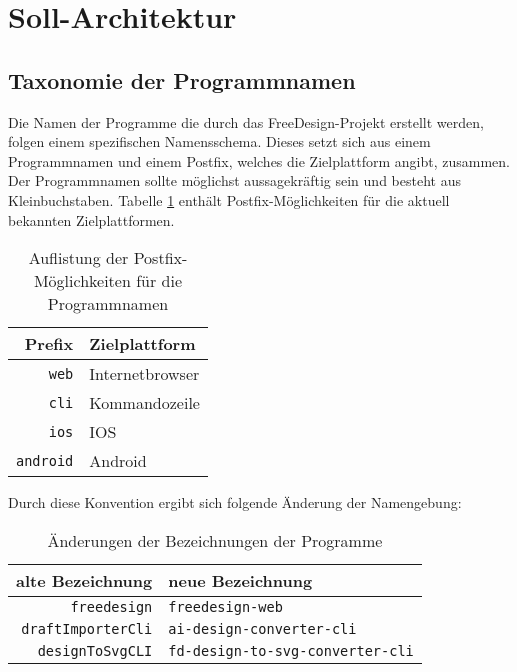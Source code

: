 \section{Soll-Architektur}
\subsection{Taxonomie der Programmnamen}
Die Namen der Programme die durch das FreeDesign-Projekt erstellt werden, folgen einem spezifischen Namensschema. Dieses setzt sich aus einem Programmnamen und einem Postfix, welches die Zielplattform angibt, zusammen. Der Programmnamen sollte möglichst aussagekräftig sein und besteht aus Kleinbuchstaben. Tabelle \ref{table:postfix} enthält Postfix-Möglichkeiten für die aktuell bekannten Zielplattformen.

\begin{table}[H]
    \centering
    \caption{Auflistung der Postfix-Möglichkeiten für die Programmnamen}
    \label{table:postfix}
    \begin{tabular}{r|l}
        \textbf{Prefix} & \textbf{Zielplattform} \\
        \hline
        \lstinline|web| & Internetbrowser \\
        \lstinline|cli| & Kommandozeile \\
        \lstinline|ios| & IOS \\
        \lstinline|android| & Android 
    \end{tabular}
\end{table}

Durch diese Konvention ergibt sich folgende Änderung der Namengebung: 
\begin{table}[H]
    \centering
    \caption{Änderungen der Bezeichnungen der Programme}
    \label{table:Programmnamen}
    \begin{tabular}{r|l}
        \textbf{alte Bezeichnung} & \textbf{neue Bezeichnung} \\
        \hline
        \lstinline|freedesign| & \lstinline|freedesign-web| \\
        \lstinline|draftImporterCli| & \lstinline|ai-design-converter-cli| \\
        \lstinline|designToSvgCLI| & \lstinline|fd-design-to-svg-converter-cli| 
    \end{tabular}
\end{table}

